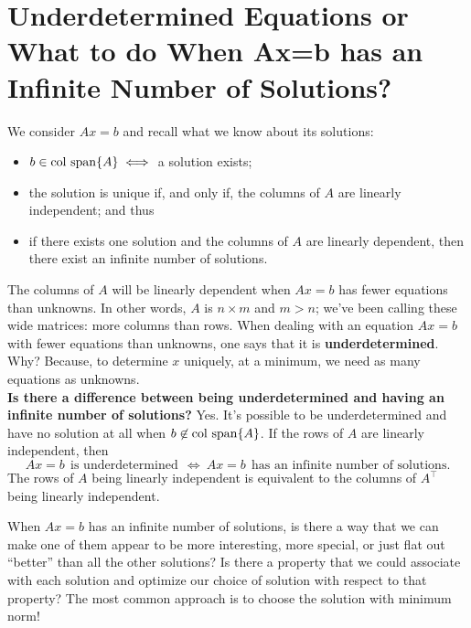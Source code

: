 \section{Underdetermined Equations or What to do When Ax=b has an Infinite Number of Solutions?}
\label{sec:MinNormSolution2LinearEquations}

We consider $Ax=b$ and recall what we know about its solutions:
\begin{itemize}
    \item $b \in \mathrm{col~span} \{ A \} \iff$ a solution exists;
    \item the solution is unique if, and only if, the columns of $A$ are linearly independent; and thus
    \item if there exists one solution and the columns of $A$ are linearly dependent, then there exist an infinite number of solutions.
\end{itemize} 

\begin{tcolorbox}[title=\textbf{\Large Underdetermined Equations}]
The columns of $A$ will be linearly dependent when $Ax=b$ has fewer equations than unknowns. In other words, $A$ is $n \times m$ and $m > n$; we've been calling these wide matrices: more columns than rows. When dealing with an equation $Ax=b$ with fewer equations than unknowns, one says that it is \textbf{underdetermined}. Why? Because, to determine $x$ uniquely, at a minimum, we need as many equations as unknowns.\\

\textbf{Is there a difference between being underdetermined and having an infinite number of solutions?} Yes. It's possible to be underdetermined and have no solution at all when $b \not \in \mathrm{col~span} \{ A \}$. If the rows of $A$ are linearly independent, then 
$$Ax=b ~~\text{is underdetermined}~~\iff ~Ax=b~~\text{has an infinite number of solutions.}$$
The rows of $A$ being linearly independent is equivalent to the columns of $A^\top$ being linearly independent.
\end{tcolorbox}
\vspace*{.2cm}
When $Ax=b$ has an infinite number of solutions, is there a way that we can make one of them appear to be more interesting, more special, or just flat out ``better'' than all the other solutions? Is there a property that we could associate with each solution and optimize our choice of solution with respect to that property? The most common approach is to choose the solution with minimum norm! \\

